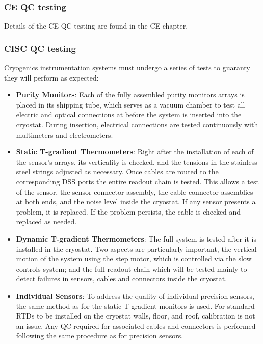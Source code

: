 \subsubsection{CE QC testing}
Details of the CE QC testing are found in the CE chapter.

\subsubsection{CISC QC testing}

Cryogenics instrumentation systems must undergo a series of tests to guaranty they will perform as expected:  

\begin{itemize}
\item {\bf Purity Monitors}: Each of the fully assembled purity monitors arrays is placed in its shipping tube, which serves as a vacuum chamber to test all electric and optical connections at \surf before the system is inserted into the cryostat. During insertion, electrical connections are tested continuously with multimeters and electrometers.

\item {\bf Static T-gradient Thermometers}: Right after the installation of each of the sensor's arrays, its verticality 
is checked, and the tensions in the stainless steel strings adjusted as necessary. Once cables are routed to the corresponding DSS ports the entire readout chain is tested. This allows a test of the sensor, the sensor-connector assembly, the cable-connector assemblies at both ends, and the noise level inside the cryostat.
If any sensor presents a problem, it is replaced. If the problem persists, the cable is checked and replaced as needed.

\item {\bf Dynamic T-gradient Thermometers}: The full system is tested after it is installed in the cryostat. Two aspects are particularly important, the vertical motion of the system using the step motor, which is controlled via the slow controls system; and the full readout chain which will be tested mainly to detect failures in sensors, cables and connectors inside the cryostat. 

\item {\bf Individual Sensors}: To address the quality of individual precision sensors, the same method as for
the static T-gradient monitors is used. For standard RTDs to be installed on the cryostat walls, floor, and roof, calibration is not an issue. Any QC required for associated cables and connectors is performed following the same procedure as for precision sensors.


\end{itemize}
